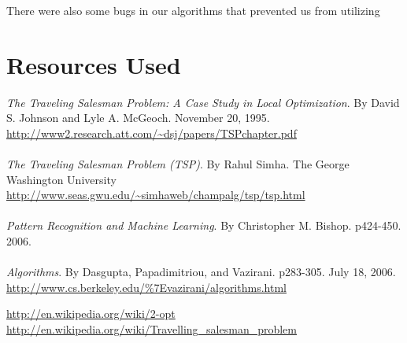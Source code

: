 \documentclass[12pt]{article}
\begin{document}
There were also some bugs in our algorithms that prevented us from utilizing 

\section*{Resources Used}

\emph{The Traveling Salesman Problem: A Case Study in Local Optimization}.  By
David S. Johnson and Lyle A. McGeoch. November 20, 1995.
\url{http://www2.research.att.com/~dsj/papers/TSPchapter.pdf}\\
\\

\emph{The Traveling Salesman Problem (TSP)}.  By Rahul Simha. The George
Washington University
\url{http://www.seas.gwu.edu/~simhaweb/champalg/tsp/tsp.html}\\
\\

\emph{Pattern Recognition and Machine Learning}. By Christopher M. Bishop.
p424-450. 2006.\\
\\

\emph{Algorithms}. By Dasgupta, Papadimitriou, and Vazirani. p283-305. July 18,
2006.  \url{http://www.cs.berkeley.edu/%7Evazirani/algorithms.html}

\url{http://en.wikipedia.org/wiki/2-opt}
\url{http://en.wikipedia.org/wiki/Travelling_salesman_problem}
\end{document}
